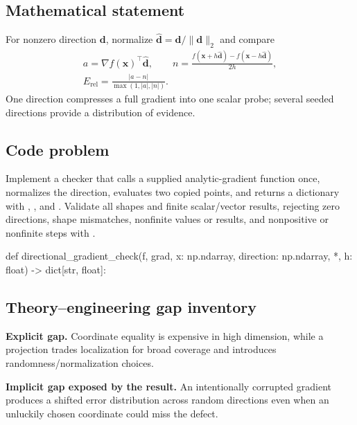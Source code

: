 
        \subsection{Mathematical statement}


For nonzero direction $\bm d$, normalize $\hat{\bm d}=\bm d/\|\bm d\|_2$ and
compare
\[
\begin{gathered}
a=\nabla f(\bm x)^\top\hat{\bm d},\qquad
n=\frac{f(\bm x+h\hat{\bm d})-f(\bm x-h\hat{\bm d})}{2h},\\
E_{\mathrm{rel}}=\frac{|a-n|}{\max(1,|a|,|n|)}.
\end{gathered}
\]
One direction compresses a full gradient into one scalar probe; several seeded
directions provide a distribution of evidence.


        \subsection{Code problem}


Implement a checker that calls a supplied analytic-gradient function once,
normalizes the direction, evaluates two copied points, and returns a dictionary
with , , and .  Validate all
shapes and finite scalar/vector results, rejecting zero directions, shape
mismatches, nonfinite values or results, and nonpositive or nonfinite steps
with .


        \begin{contractbox}
        \begin{Code}
        def directional_gradient_check(f, grad, x: np.ndarray, direction: np.ndarray, *, h: float) -> dict[str, float]:
        \end{Code}
        \end{contractbox}

        \subsection{Theory--engineering gap inventory}

        \begin{gapbox}
        \textbf{Explicit gap.} Coordinate equality is expensive in high dimension, while a projection trades localization for broad coverage and introduces randomness/normalization choices.

        \textbf{Implicit gap exposed by the result.} An intentionally corrupted gradient produces a shifted error distribution across random directions even when an unluckily chosen coordinate could miss the defect.
        \end{gapbox}

